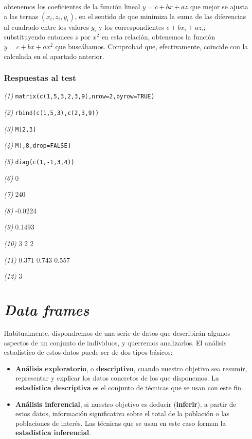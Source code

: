 \documentclass[]{book}
\theoremstyle{definition}
\theoremstyle{definition}
\theoremstyle{definition}
\theoremstyle{remark}
\begin{document}
obtenemos los coeficientes de la función lineal \(y=c+bx+az\) que mejor se ajusta a las ternas \((x_i,z_i,y_i)\), en el sentido de que minimiza la suma de las diferencias al cuadrado entre los valores \(y_i\) y los correspondientes \(c+bx_i+az_i\); substituyendo entonces \(z\) por \(x^2\) en esta relación, obtenemos la función \(y=c+bx+ax^2\) que buscábamos. Comprobad que, efectivamente, coincide con la calculada en el apartado anterior.

\hypertarget{respuestas-al-test-2}{%
\subsection*{Respuestas al test}\label{respuestas-al-test-2}}

\emph{(1)} \texttt{matrix(c(1,5,3,2,3,9),nrow=2,byrow=TRUE)}

\emph{(2)} \texttt{rbind(c(1,5,3),c(2,3,9))}

\emph{(3)} \texttt{M{[}2,3{]}}

\emph{(4)} \texttt{M{[},8,drop=FALSE{]}}

\emph{(5)} \texttt{diag(c(1,-1,3,4))}

\emph{(6)} 0

\emph{(7)} 240

\emph{(8)} -0.0224

\emph{(9)} 0.1493

\emph{(10)} 3 2 2

\emph{(11)} 0.371 0.743 0.557

\emph{(12)} 3

\hypertarget{chap:df}{%
\chapter{\texorpdfstring{\emph{Data frames}}{Data frames}}\label{chap:df}}

Habitualmente, dispondremos de una serie de datos que describirán algunos
aspectos de un conjunto de individuos, y querremos analizarlos. El análisis estadístico de estos datos puede ser de dos tipos básicos:

\begin{itemize}
\item
  \textbf{Análisis exploratorio}, o \textbf{descriptivo}, cuando nuestro objetivo sea resumir, representar y explicar los datos concretos de los que disponemos. La \textbf{estadística descriptiva} es el conjunto de técnicas que se usan con este fin.
\item
  \textbf{Análisis inferencial}, si nuestro objetivo es deducir (\textbf{inferir}), a partir de estos datos,
  información significativa sobre el total de la población o las poblaciones de interés. Las técnicas que se usan en este caso forman la \textbf{estadística inferencial}.
\end{itemize}
\end{document}
